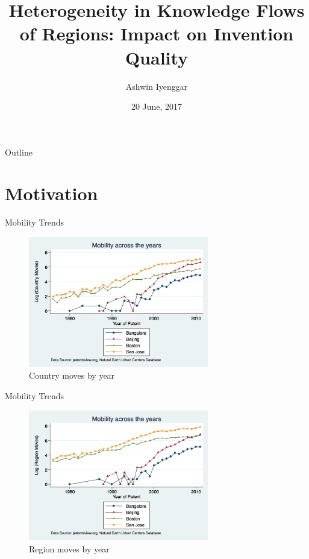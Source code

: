 \documentclass{beamer}
\title{Heterogeneity in Knowledge Flows of Regions: Impact on Invention Quality}
\author{Ashwin Iyenggar}
\institute[Indian Institute of Management Bangalore] 
{
  Strategy Area\\
  Indian Institute of Management Bangalore
}
\date{20 June, 2017}
\begin{document}
\begin{frame}
  \titlepage
\end{frame}

\begin{frame}{Outline}
  \tableofcontents
\end{frame}
\section{Motivation}

\begin{frame}{Mobility Trends}
\begin{figure}[h]
\begin{centering}
  \includegraphics[width=0.7\textwidth]{countrymoves}
  \caption{Country moves by year}
   \label{fig:countrymoves}
\end{centering}
\end{figure}
\end{frame}

\begin{frame}{Mobility Trends}
\begin{figure}[h]
\begin{centering}
  \includegraphics[width=0.7\textwidth]{regionmoves}
  \caption{Region moves by year}
   \label{fig:regionmoves}
\end{centering}
\end{figure}
\end{frame}
\end{document}
